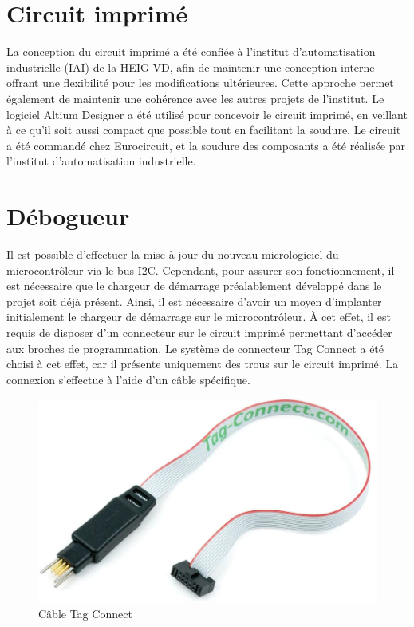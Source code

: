 \section{Circuit imprimé}

La conception du circuit imprimé a été confiée à l'institut d'automatisation industrielle (IAI) de la HEIG-VD, afin de maintenir une conception interne offrant une flexibilité pour les modifications ultérieures.
Cette approche permet également de maintenir une cohérence avec les autres projets de l'institut.
Le logiciel Altium Designer a été utilisé pour concevoir le circuit imprimé, en veillant à ce qu'il soit aussi compact que possible tout en facilitant la soudure.
Le circuit a été commandé chez Eurocircuit, et la soudure des composants a été réalisée par l'institut d'automatisation industrielle.

\section{Débogueur}

Il est possible d'effectuer la mise à jour du nouveau micrologiciel du microcontrôleur via le bus I2C.
Cependant, pour assurer son fonctionnement, il est nécessaire que le chargeur de démarrage préalablement développé dans le projet soit déjà présent.
Ainsi, il est nécessaire d'avoir un moyen d'implanter initialement le chargeur de démarrage sur le microcontrôleur.
À cet effet, il est requis de disposer d'un connecteur sur le circuit imprimé permettant d'accéder aux broches de programmation.
Le système de connecteur Tag Connect a été choisi à cet effet, car il présente uniquement des trous sur le circuit imprimé.
La connexion s'effectue à l'aide d'un câble spécifique.

\begin{figure}[H]
    \centering
    \includegraphics[scale=0.2]{./assets/figures/tag_connect.png}
    \caption{\cite{tag_connect} Câble Tag Connect}
\end{figure}

